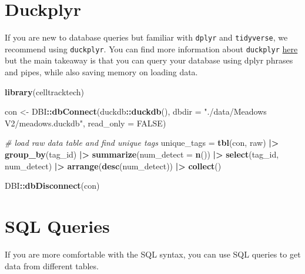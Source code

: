 \documentclass[
]{book}
\newenvironment{Shaded}{\begin{snugshade}}{\end{snugshade}}
\newcommand{\AttributeTok}[1]{\textcolor[rgb]{0.13,0.29,0.53}{#1}}
\newcommand{\CommentTok}[1]{\textcolor[rgb]{0.56,0.35,0.01}{\textit{#1}}}
\newcommand{\ConstantTok}[1]{\textcolor[rgb]{0.56,0.35,0.01}{#1}}
\newcommand{\FunctionTok}[1]{\textcolor[rgb]{0.13,0.29,0.53}{\textbf{#1}}}
\newcommand{\NormalTok}[1]{#1}
\newcommand{\OtherTok}[1]{\textcolor[rgb]{0.56,0.35,0.01}{#1}}
\newcommand{\SpecialCharTok}[1]{\textcolor[rgb]{0.81,0.36,0.00}{\textbf{#1}}}
\newcommand{\StringTok}[1]{\textcolor[rgb]{0.31,0.60,0.02}{#1}}
\begin{document}
\section{Duckplyr}\label{duckplyr}

If you are new to database queries but familiar with \texttt{dplyr} and \texttt{tidyverse}, we recommend using \texttt{duckplyr}. You can find more information about \texttt{duckplyr} \href{https://duckdb.org/2024/04/02/duckplyr.html}{here} but the main takeaway is that you can query your database using dplyr phrases and pipes, while also saving memory on loading data.

\begin{Shaded}
\begin{Highlighting}[]
\FunctionTok{library}\NormalTok{(celltracktech)}

\NormalTok{con }\OtherTok{\textless{}{-}}\NormalTok{ DBI}\SpecialCharTok{::}\FunctionTok{dbConnect}\NormalTok{(duckdb}\SpecialCharTok{::}\FunctionTok{duckdb}\NormalTok{(), }
                      \AttributeTok{dbdir =} \StringTok{"./data/Meadows V2/meadows.duckdb"}\NormalTok{, }
                      \AttributeTok{read\_only =} \ConstantTok{FALSE}\NormalTok{)}

\CommentTok{\# load raw data table and find unique tags}
\NormalTok{unique\_tags }\OtherTok{=} \FunctionTok{tbl}\NormalTok{(con, }\StringTok{\textquotesingle{}raw\textquotesingle{}}\NormalTok{) }\SpecialCharTok{|\textgreater{}} 
  \FunctionTok{group\_by}\NormalTok{(tag\_id) }\SpecialCharTok{|\textgreater{}}
  \FunctionTok{summarize}\NormalTok{(}\AttributeTok{num\_detect =} \FunctionTok{n}\NormalTok{()) }\SpecialCharTok{|\textgreater{}}
  \FunctionTok{select}\NormalTok{(tag\_id, num\_detect) }\SpecialCharTok{|\textgreater{}}
  \FunctionTok{arrange}\NormalTok{(}\FunctionTok{desc}\NormalTok{(num\_detect)) }\SpecialCharTok{|\textgreater{}}
  \FunctionTok{collect}\NormalTok{()}

\NormalTok{DBI}\SpecialCharTok{::}\FunctionTok{dbDisconnect}\NormalTok{(con)}
\end{Highlighting}
\end{Shaded}

\section{SQL Queries}\label{sql-queries}

If you are more comfortable with the SQL syntax, you can use SQL queries to get data from different tables.
\end{document}
